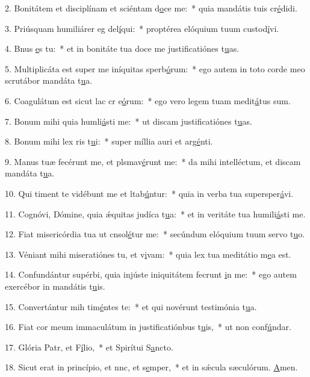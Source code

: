 2. Bonitátem et disciplínam et sciéntam d\uline{o}ce me:~* quia mandátis tuis cr\uline{é}didi.\par 
3. Priúsquam humiliárer eg del\uline{í}qui:~* proptérea elóquium tuum custod\uline{í}vi.\par 
4. Bnus \uline{e}s tu:~* et in bonitáte tua doce me justificatiónes t\uline{u}as.\par 
5. Multiplicáta est super me iníquitas sperb\uline{ó}rum:~* ego autem in toto corde meo scrutábor mandáta t\uline{u}a.\par 
6. Coagulátum est sicut lac cr e\uline{ó}rum:~* ego vero legem tuam medit\uline{á}tus sum.\par 
7. Bonum mihi quia humli\uline{á}sti me:~* ut discam justificatiónes t\uline{u}as.\par 
8. Bonum mihi lex ris t\uline{u}i:~* super míllia auri et arg\uline{é}nti.\par 
9. Manus tuæ fecérunt me, et plsmav\uline{é}runt me:~* da mihi intelléctum, et discam mandáta t\uline{u}a.\par 
10. Qui timent te vidébunt me et ltab\uline{ú}ntur:~* quia in verba tua supersper\uline{á}vi.\par 
11. Cognóvi, Dómine, quia ǽquitas judíca t\uline{u}a:~* et in veritáte tua humili\uline{á}sti me.\par 
12. Fiat misericórdia tua ut cnsol\uline{é}tur me:~* secúndum elóquium tuum servo t\uline{u}o.\par 
13. Véniant mihi miseratiónes tu, et v\uline{i}vam:~* quia lex tua meditátio m\uline{e}a est.\par 
14. Confundántur supérbi, quia injúste iniquitátem fecrunt \uline{i}n me:~* ego autem exercébor in mandátis t\uline{u}is.\par 
15. Convertántur mih tim\uline{é}ntes te:~* et qui novérunt testimónia t\uline{u}a.\par 
16. Fiat cor meum immaculátum in justificatiónbus t\uline{u}is,~* ut non conf\uline{ú}ndar.\par 
17. Glória Patr, et F\uline{í}lio,~* et Spirítui S\uline{a}ncto.\par 
18. Sicut erat in princípio, et nnc, et s\uline{e}mper,~* et in sǽcula sæculórum. \uline{A}men.\par 
